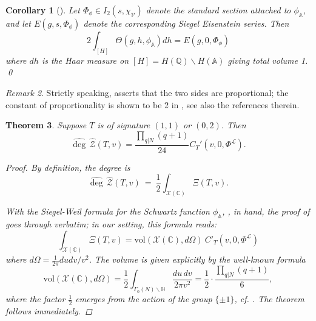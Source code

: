 \documentclass[reqno,oneside]{amsart}
\theoremstyle{plain}
\newtheorem{theorem}{Theorem}
\newtheorem{corollary}[theorem]{Corollary}
\theoremstyle{remark}
\newtheorem{remark}[theorem]{Remark}
\numberwithin{theorem}{section}
\newcommand{\bbA}{\mathbb A}
\newcommand{\bbC}{\mathbb C}
\newcommand{\bbH}{\mathbb H}
\newcommand{\bbQ}{\mathbb Q}
\newcommand{\calL}{\mathcal L}
\newcommand{\calV}{\mathcal V}
\newcommand{\calX}{\mathcal X}
\begin{document}
	\begin{corollary}[{\cite{KudlaRallisRegSW}}] \label{cor:Siegel Weil nu} Let $\Phi_{\phi} \in I_2(s, \chi_{\calV})$ denote the standard section attached to $\phi_{\bbA}$, and let $E(g, s, \Phi_{\phi})$ denote the corresponding Siegel Eisenstein series. Then
		\begin{equation}
		2  	\int_{[H]} \Theta(g,h,\phi_{\bbA}) dh =  E(g,  0, \Phi_{\phi})
		\end{equation}
		where $dh$ is the Haar measure on $[H] = H(\bbQ) \backslash H(\bbA)$ giving total volume 1.  \qed
	\end{corollary}
	\begin{remark} Strictly speaking, \cite{KudlaRallisRegSW} asserts that the two sides are proportional; the constant of proportionality is shown to be 2 in \cite[Theorem 7.3(ii)]{GanQiuTakeda}, see also the references therein. \end{remark}
	
	\begin{theorem} Suppose $T$ is of signature $(1,1)$ or $(0,2)$. Then
		\[
		\widehat{\deg}  \, \widehat{\mathcal Z}(T,v) =  \frac{\prod_{q|N}(q+1)}{24}   C_{T}'(v,0, \Phi^{\calL}).
		\]
		
		\begin{proof}
			By definition,  the  degree is
			\begin{equation}
			\widehat \deg \, \widehat{ \mathcal Z}(T,v)  \ = \ \frac12  \int_{\calX(\bbC)} \Xi(T,v) .
			\end{equation}
			
			With the Siegel-Weil formula for the Schwartz function $\phi_{\bbA}$, , in hand, the proof of \cite[Theorem 5.10]{GarciaSankaran} goes through verbatim; in our setting, this formula reads:
			\begin{equation}
			\int_{\calX(\bbC)} \Xi(T,v) =   \mathrm{vol}(\calX(\bbC), d \Omega)   \ C'_T(v,0, \Phi^{\calL})
			\end{equation}
			where $d \Omega =\frac{1}{2\pi} du dv / v^2$. The volume is given explicitly by the well-known formula
			\begin{equation}
			\mathrm{vol}(\calX(\bbC), d \Omega) = \frac{1}{ 2} \int_{\Gamma_0(N) \backslash \bbH}  \frac{du \, dv}{ 2 \pi v^2} =  \frac12 \cdot \frac{\prod_{q|N}(q+1)}{6},
			\end{equation}
			where the factor $\frac12$ emerges from the action of the group $\{\pm 1 \}$, cf. . The theorem follows immediately.
		\end{proof}
	\end{theorem}
	
\end{document}
